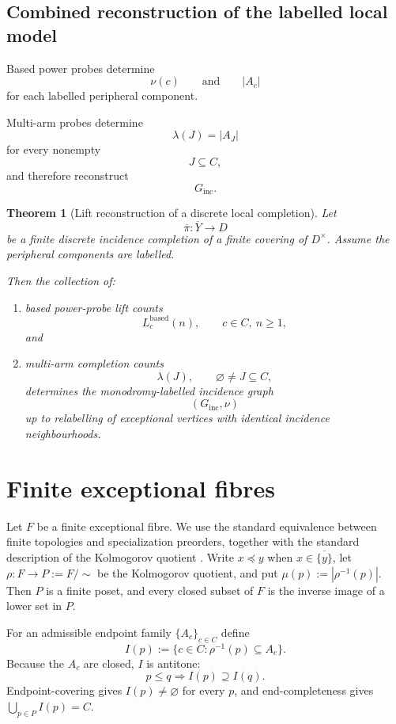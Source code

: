 \documentclass[11pt]{article}
\theoremstyle{plain}
\newtheorem{theorem}{Theorem}[section]
\theoremstyle{definition}
\begin{document}
\subsection{Combined reconstruction of the labelled local model}
\label{subsec:combined-reconstruction}

Based power probes determine
\[
\nu(c)
\qquad\text{and}\qquad
|A_c|
\]
for each labelled peripheral component.

Multi-arm probes determine
\[
\lambda(J)
=
|A_J|
\]
for every nonempty
\[
J\subseteq C,
\]
and therefore reconstruct
\[
G_{\mathrm{inc}}.
\]


\begin{theorem}[Lift reconstruction of a discrete local completion]
\label{thm:full-lift-reconstruction}
Let
\[
\overline\pi:\overline Y\to D
\]
be a finite discrete incidence completion of a finite covering of
$D^\times$.  Assume the peripheral components are labelled.

Then the collection of:
\begin{enumerate}[label=(\roman*)]
\item based power-probe lift counts
\[
L_c^{\mathrm{based}}(n),
\qquad
c\in C,\ n\geq1,
\]
and
\item multi-arm completion counts
\[
\lambda(J),
\qquad
\varnothing\neq J\subseteq C,
\]
determines the monodromy-labelled incidence graph
\[
(G_{\mathrm{inc}},\nu)
\]
up to relabelling of exceptional vertices with identical incidence
neighbourhoods.
\end{enumerate}
\end{theorem}




\section{Finite exceptional fibres}
\label{sec:finite-fibres}

Let $F$ be a finite exceptional fibre.  We use the standard equivalence between
finite topologies and specialization preorders, together with the standard description
of the Kolmogorov quotient \citep{Alexandroff1937,Stong1966,McCord1966,Barmak2011}.
Write $x\preceq y$ when $x\in\overline{\{y\}}$, let $\rho:F\to P:=F/{\sim}$ be
the Kolmogorov quotient, and put $\mu(p):=|\rho^{-1}(p)|$.  Then $P$ is a finite
poset, and every closed subset of $F$ is the inverse image of a lower set in $P$.

For an admissible endpoint family $\{A_c\}_{c\in C}$ define
\[
I(p):=\{c\in C:\rho^{-1}(p)\subseteq A_c\}.
\]
Because the $A_c$ are closed, $I$ is antitone:
\[
p\leq q\Longrightarrow I(p)\supseteq I(q).
\]
Endpoint-covering gives $I(p)\neq\varnothing$ for every $p$, and end-completeness gives
$\bigcup_{p\in P}I(p)=C$.
\end{document}

